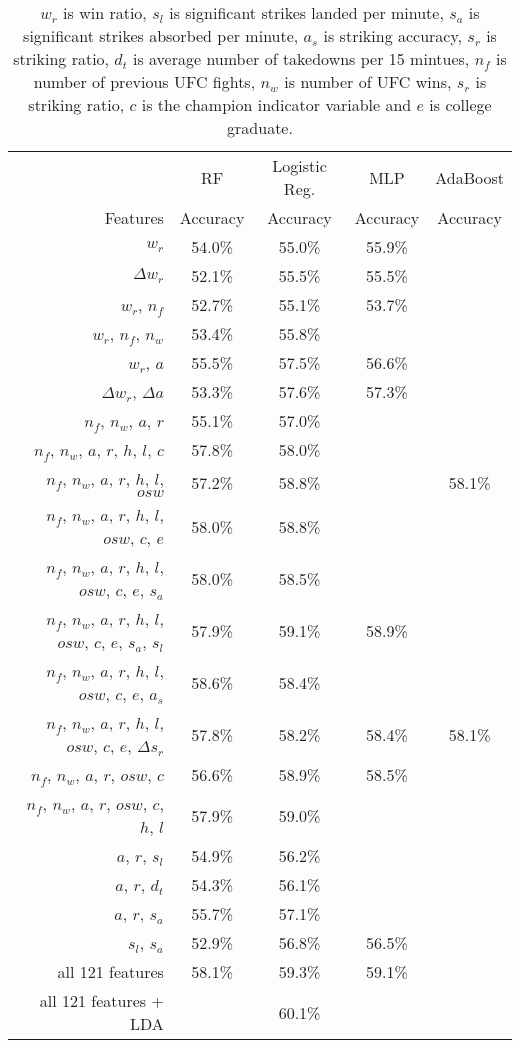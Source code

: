 \begin{center}
\begin{table}[h]
\begin{tabular}{r|cccc}
\toprule
         & RF       & Logistic Reg. & MLP      & AdaBoost\\
Features & Accuracy & Accuracy      & Accuracy & Accuracy\\
\hline
$w_r$ & 54.0\% & 55.0\% & 55.9\% & \\
$\Delta w_r$ & 52.1\% & 55.5\% & 55.5\% & \\
$w_r$, $n_f$ & 52.7\% & 55.1\% & 53.7\% & \\
$w_r$, $n_f$, $n_w$ & 53.4\% & 55.8\% &  & \\
$w_r$, $a$ & 55.5\% & 57.5\% & 56.6\% & \\
$\Delta w_r$, $\Delta a$ & 53.3\% & 57.6\% & 57.3\% & \\
$n_f$, $n_w$, $a$, $r$ & 55.1\% & 57.0\% \\
$n_f$, $n_w$, $a$, $r$, $h$, $l$, $c$ & 57.8\% & 58.0\% & &\\
$n_f$, $n_w$, $a$, $r$, $h$, $l$, $osw$ & 57.2\% & 58.8\% & & 58.1\%\\
$n_f$, $n_w$, $a$, $r$, $h$, $l$, $osw$, $c$, $e$ & 58.0\% & 58.8\% & &\\
$n_f$, $n_w$, $a$, $r$, $h$, $l$, $osw$, $c$, $e$, $s_a$ & 58.0\% & 58.5\% & & \\
$n_f$, $n_w$, $a$, $r$, $h$, $l$, $osw$, $c$, $e$, $s_a$, $s_l$ & 57.9\% &59.1\% &58.9\% & \\
$n_f$, $n_w$, $a$, $r$, $h$, $l$, $osw$, $c$, $e$, $a_s$ & 58.6\% & 58.4\% \\
$n_f$, $n_w$, $a$, $r$, $h$, $l$, $osw$, $c$, $e$, $\Delta s_r$ & 57.8\% & 58.2\% & 58.4\% & 58.1\%\\
$n_f$, $n_w$, $a$, $r$, $osw$, $c$ & 56.6\% & 58.9\% & 58.5\% \\
$n_f$, $n_w$, $a$, $r$, $osw$, $c$, $h$, $l$ & 57.9\% & 59.0\% & &\\
$a$, $r$, $s_l$ & 54.9\% & 56.2\% & & \\
$a$, $r$, $d_t$ & 54.3\% & 56.1\% & & \\
$a$, $r$, $s_a$ & 55.7\% & 57.1\% & & \\
$s_l$, $s_a$ & 52.9\% & 56.8\% & 56.5\% & \\
all 121 features & 58.1\% & 59.3\% & 59.1\% & \\
all 121 features + LDA &  & 60.1\% & & \\
\bottomrule
\end{tabular}
\caption{$w_r$ is win ratio, $s_l$ is significant strikes landed per minute,
$s_a$ is significant strikes absorbed per minute, $a_s$ is striking accuracy,
$s_r$ is striking ratio, $d_t$ is average number of takedowns per 15 mintues,
$n_f$ is number of previous UFC fights, $n_w$ is number
of UFC wins, $s_r$ is striking ratio, $c$ is the champion indicator variable and $e$ is college graduate.}
\label{other_features}
\end{table}
\end{center}

